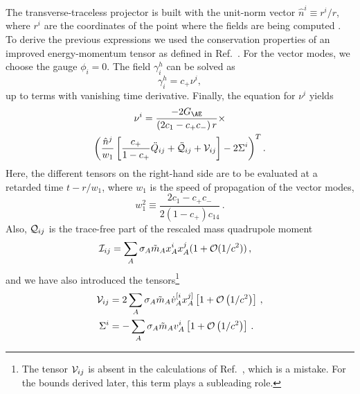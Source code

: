 \documentclass[prd,aps,twocolumn,nofootinbib,showpacs,superscriptaddress]{revtex4-1}
\newcommand\be{\begin{equation}}
\newcommand\ee{\end{equation}}
\begin{document}
The transverse-traceless projector is built with the unit-norm vector $\hat n^i\equiv r^i/r$, where $r^i$ are the coordinates of the point
where the fields are being computed \cite{Blas:2011zd}.
To derive the previous expressions we used the conservation properties of an improved  energy-momentum tensor 
as defined in Ref.~\cite{Foster:2007gr}.
  For the vector modes, we choose the gauge $\phi_i=0$. The field $\gamma_i^h$ can be solved as
\be
\gamma_i^h=c_+ \nu^i,
\ee
up to terms with vanishing time derivative.
 Finally, 
the equation for $\nu^i$ yields
\begin{multline}
\label{eq:wave_v}
\nu^i=\frac{-2 G_{\AE}}{(2c_1-c_+ c_-)\,r}\times\\\left(\frac{\hat n^j}{w_1}\left[\frac{c_+}{1-c_+}\ddot Q_{ij}+\ddot{\cal Q}_{ij}+{\cal V}_{ij}\right]-2\Sigma^i\right)^T.
\end{multline}
Here, the different tensors on the right-hand side are to be evaluated at a retarded time $t-r/w_1$,
where $w_1$ is the speed of propagation of the vector modes,
\be
\label{w1-def}
w_1^2 \equiv \frac{2 c_1 - c_{+} c_{-}}{2(1-c_{+}) c_{14}}\,.
\ee 
Also, ${\cal Q}_{ij}$ is the trace-free part of the rescaled mass  quadrupole moment
\begin{align}
{\cal I}_{ij} &=\sum_{A} \sigma_A \tilde m_A x_A^i x_A^j (1+{\cal{O}}(1/c^{2})) \,, 
\end{align}
and we have also introduced the tensors\footnote{The tensor ${\cal V}_{ij}$ is absent in the calculations of
Ref.~\cite{Foster:2007gr}, which is a mistake. For the bounds derived later, this
term plays a subleading role.}
\begin{align}
{\cal V}_{ij}&=2\sum_A \sigma_A \tilde m_A \dot v^{[i}_A x_A^{j]} \left[1+{\cal{O}}\left({1}/{c^{2}}\right)\right]\,,\\
\label{Sigma-mom}
\Sigma^i &=-\sum_A\sigma_A \tilde m_A v^i_A \left[1+{\cal{O}}\left({1}/{c^{2}}\right)\right]\,.
\end{align}
\end{document}
